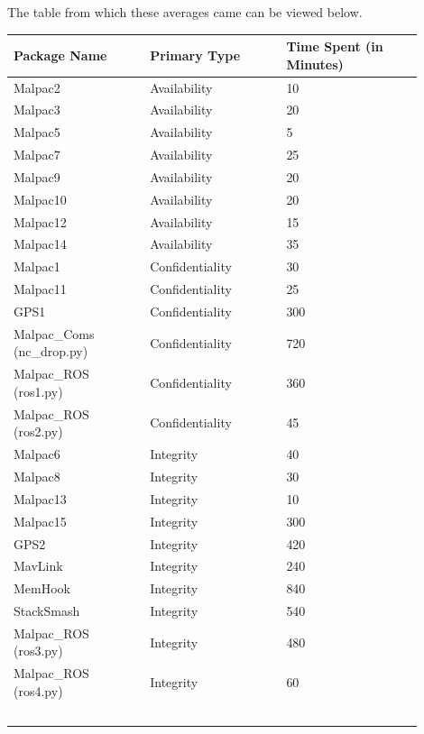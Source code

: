 \documentclass[IEEEtran,letterpaper,10pt,notitlepage,draftclsnofoot]{article}
\begin{document}
The table from which these averages came can be viewed below.

\begin{center}
\begin{tabular}{ |p{0.3\linewidth}|p{0.3\linewidth}|p{0.3\linewidth}| }
\hline
    Package Name & Primary Type & Time Spent (in Minutes) \\ \hline
    Malpac2 & Availability & 10 \\ \hline
    Malpac3 & Availability & 20 \\ \hline
    Malpac5 & Availability & 5 \\ \hline
    Malpac7 & Availability & 25 \\ \hline
    Malpac9 & Availability & 20 \\ \hline
    Malpac10 & Availability & 20 \\ \hline
    Malpac12 & Availability & 15 \\ \hline
    Malpac14 & Availability & 35 \\ \hline
    Malpac1 & Confidentiality & 30 \\ \hline
    Malpac11 & Confidentiality & 25 \\ \hline
    GPS1 & Confidentiality & 300 \\ \hline
    Malpac\_Coms (nc\_drop.py) & Confidentiality & 720 \\ \hline
    Malpac\_ROS (ros1.py) & Confidentiality & 360 \\ \hline
    Malpac\_ROS (ros2.py) & Confidentiality & 45 \\ \hline
    Malpac6 & Integrity & 40 \\ \hline
    Malpac8 & Integrity & 30 \\ \hline
    Malpac13 & Integrity & 10 \\ \hline
    Malpac15 & Integrity & 300 \\ \hline
    GPS2 & Integrity & 420 \\ \hline
    MavLink & Integrity & 240 \\ \hline
    MemHook & Integrity & 840 \\ \hline
    StackSmash & Integrity & 540 \\ \hline
    Malpac\_ROS (ros3.py) & Integrity & 480 \\ \hline
    Malpac\_ROS (ros4.py) & Integrity & 60 \\ \hline
     &  & \  \\ \hline
\end{tabular}
\end{center} 
\end{document}
